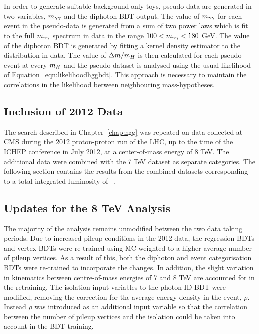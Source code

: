 In order to generate suitable background-only toys, pseudo-data are generated in two variables, 
$m_{\gamma\gamma}$ and the diphoton BDT output. The value of $m_{\gamma\gamma}$ for each event in the pseudo-data 
is generated from a sum of two power laws which is 
fit to the full $m_{\gamma\gamma}$ spectrum in data in the range $100 < m_{\gamma\gamma} < 180$ GeV. The value of the diphoton BDT 
is generated by fitting a kernel density estimator to the distribution in data. The value of $\Delta m/m_{H}$ is then 
calculated for each pseudo-event at every $m_{H}$ and the pseudo-dataset is analysed using the usual likelihood
of Equation~\ref{eqn:likelihoodhggbdt}. This approach is necessary to maintain
the correlations in the likelihood between neighbouring mass-hypotheses.


\subsection{Inclusion of 2012 Data}
\label{sec:8tev}

The search described in Chapter~\ref{chap:hgg} was repeated on data collected at CMS 
during the 2012 proton-proton run of the LHC, up to the time of the ICHEP conference in July 2012,  
at a center-of-mass energy of 8 TeV. The additional 
data were combined with the 7 TeV dataset as separate categories. 
The following section contains the results from the combined datasets corresponding to a 
total integrated luminosity of \clumicomb~\cite{HIG-12-028}.

\subsection{Updates for the 8 TeV Analysis}
\label{sec:updates8TeV}

The majority of the analysis remains unmodified between the two data taking periods.
Due to increased pileup conditions in the 2012 data, the regression BDTs and vertex BDTs
were re-trained using MC weighted to a higher average number of pileup vertices. 
As a result of this, both the diphoton and event categorisation BDTs were re-trained 
to incorporate the changes. In addition, the slight variation in kinematics between 
centre-of-mass energies of 7 and 8 TeV are accounted for in the retraining.
The isolation input variables to the photon ID BDT were modified, removing the correction
for the average energy density in the event, $\rho$. 
Instead $\rho$ was introduced as an additional input
variable so that the correlation between the number of pileup vertices and the isolation
could be taken into account in the BDT training. 


